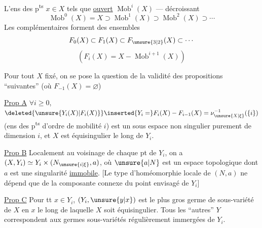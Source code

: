 L'ens des p\textsuperscript{ts} $x\in X$ tels que    \uline{ouvert}  $\operatorname{Mob}^i(X)$ ---  décroissant
\[
\operatorname{Mob}^0(X)=X\supset\operatorname{Mob}^1(X)\supset\operatorname{Mob}^2(X)\supset\cdots
\]
Les complémentaires forment des  ensembles
\[
F_0(X)\subset F_1(X)\subset F_{\unsure{3|2}}(X)\subset\cdots
\]
\[
(F_i(X)=X-\operatorname{Mob}^{i+1}(X))
\]

Pour tout $X$ fixé, on se pose la question  de la validité des propositions ``suivantes'' (où $F_{-1}(X)=\varnothing$)

\uline{Prop A} $\forall i\geq0$, $\deleted{\unsure{Y_i(X)|F_i(X)}}\inserted{Y_i=}F_i(X)-F_{i-1}(X)=\nu_{\unsure{X|\xi}}^{-1}(\{i\})$ (ens des p\textsuperscript{ts} d'ordre de mobilité $i$) est un sous espace non singulier purement de dimension $i$, et $X$ est équisingulier le long de $Y_i$.

\uline{Prop B} Localement au voisinage de chaque pt de $Y_i$, on a $(X,Y_i)\simeq Y_i\times(N_{\unsure{i|\xi}},a)$, où $\unsure{a|N}$ est un espace topologique dont $a$ est une singularité \uline{immobile}. [Le type d'homéomorphie locale de $(N,a)$ ne dépend que de la composante connexe du point envisagé de $Y_i$]

\uline{Prop C} Pour tt $x\in Y_i$, $(Y_i,\unsure{y|x})$ est le  plus gros germe de sous-variété  de $X$ en $x$ le long de laquelle $X$ soit équisingulier. Tous les ``autres'' $Y$ correspondent  aux germes  sous-variétés régulièrement immergées de $Y_i$. 

